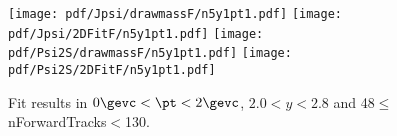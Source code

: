\begin{figure}[H]
\begin{center}
\texttt{[image: pdf/Jpsi/drawmassF/n5y1pt1.pdf]}
\texttt{[image: pdf/Jpsi/2DFitF/n5y1pt1.pdf]}
\vspace*{-0.5cm}
\texttt{[image: pdf/Psi2S/drawmassF/n5y1pt1.pdf]}
\texttt{[image: pdf/Psi2S/2DFitF/n5y1pt1.pdf]}
\vspace*{-0.5cm}
\end{center}
\caption{Fit results in $0\gevc<\pt<2\gevc$, $2.0<y<2.8$ and 48$\leq$nForwardTracks$<$130.}
\label{Fitn5y1pt1}
\end{figure}
